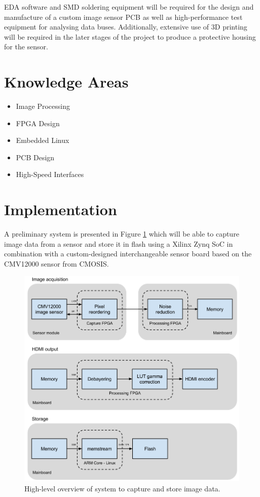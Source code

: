 \documentclass[a4paper]{article}
\begin{document}
EDA software and SMD soldering equipment will be required for the design and manufacture of a custom image sensor PCB as well as high-performance test equipment for analysing data buses. Additionally, extensive use of 3D printing will be required in the later stages of the project to produce a protective housing for the sensor.

\section{Knowledge Areas}

\begin{itemize}
\item Image Processing
\item FPGA Design
\item Embedded Linux
\item PCB Design
\item High-Speed Interfaces
\end{itemize}

\section{Implementation}

A preliminary system is presented in Figure \ref{fig:system} which will be able to capture image data from a sensor and store it in flash using a Xilinx Zynq SoC in combination with a custom-designed interchangeable sensor board based on the CMV12000 sensor from CMOSIS.

\begin{figure}
\centering
\includegraphics[width=1\textwidth]{system.png}
\caption{\label{fig:system}High-level overview of system to capture and store image data.}
\end{figure}
\end{document}
